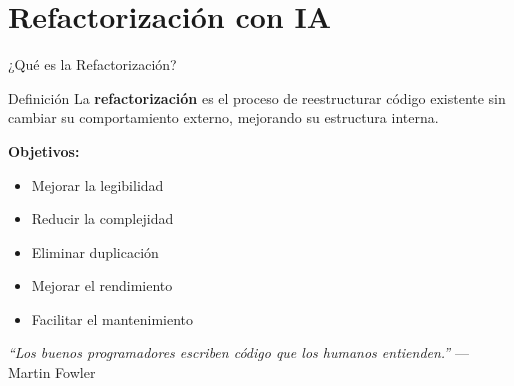 \documentclass[aspectratio=169]{beamer}
\begin{document}
\section{Refactorización con IA}

\begin{frame}{¿Qué es la Refactorización?}
    \begin{block}{Definición}
        La \textbf{refactorización} es el proceso de reestructurar código existente sin cambiar su comportamiento externo, mejorando su estructura interna.
    \end{block}
    \vspace{0.3cm}
    
    \textbf{Objetivos:}
    \begin{itemize}
        \item Mejorar la legibilidad
        \item Reducir la complejidad
        \item Eliminar duplicación
        \item Mejorar el rendimiento
        \item Facilitar el mantenimiento
    \end{itemize}
    \vspace{0.3cm}
    
    \centering
    \textit{``Los buenos programadores escriben código que los humanos entienden.''} — Martin Fowler
\end{frame}
\end{document}
